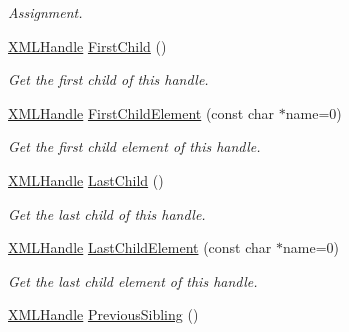 \begin{DoxyCompactItemize}
\begin{DoxyCompactList}\small\item\em Assignment. \end{DoxyCompactList}\item 
\hypertarget{classtinyxml2_1_1_x_m_l_handle_a536447dc7f54c0cd11e031dad94795ae}{}\hyperlink{classtinyxml2_1_1_x_m_l_handle}{X\+M\+L\+Handle} \hyperlink{classtinyxml2_1_1_x_m_l_handle_a536447dc7f54c0cd11e031dad94795ae}{First\+Child} ()\label{classtinyxml2_1_1_x_m_l_handle_a536447dc7f54c0cd11e031dad94795ae}

\begin{DoxyCompactList}\small\item\em Get the first child of this handle. \end{DoxyCompactList}\item 
\hypertarget{classtinyxml2_1_1_x_m_l_handle_a74b04dd0f15e0bf01860e282b840b6a3}{}\hyperlink{classtinyxml2_1_1_x_m_l_handle}{X\+M\+L\+Handle} \hyperlink{classtinyxml2_1_1_x_m_l_handle_a74b04dd0f15e0bf01860e282b840b6a3}{First\+Child\+Element} (const char $\ast$name=0)\label{classtinyxml2_1_1_x_m_l_handle_a74b04dd0f15e0bf01860e282b840b6a3}

\begin{DoxyCompactList}\small\item\em Get the first child element of this handle. \end{DoxyCompactList}\item 
\hypertarget{classtinyxml2_1_1_x_m_l_handle_a9d09f04435f0f2f7d0816b0198d0517b}{}\hyperlink{classtinyxml2_1_1_x_m_l_handle}{X\+M\+L\+Handle} \hyperlink{classtinyxml2_1_1_x_m_l_handle_a9d09f04435f0f2f7d0816b0198d0517b}{Last\+Child} ()\label{classtinyxml2_1_1_x_m_l_handle_a9d09f04435f0f2f7d0816b0198d0517b}

\begin{DoxyCompactList}\small\item\em Get the last child of this handle. \end{DoxyCompactList}\item 
\hypertarget{classtinyxml2_1_1_x_m_l_handle_a42cccd0ce8b1ce704f431025e9f19e0c}{}\hyperlink{classtinyxml2_1_1_x_m_l_handle}{X\+M\+L\+Handle} \hyperlink{classtinyxml2_1_1_x_m_l_handle_a42cccd0ce8b1ce704f431025e9f19e0c}{Last\+Child\+Element} (const char $\ast$name=0)\label{classtinyxml2_1_1_x_m_l_handle_a42cccd0ce8b1ce704f431025e9f19e0c}

\begin{DoxyCompactList}\small\item\em Get the last child element of this handle. \end{DoxyCompactList}\item 
\hypertarget{classtinyxml2_1_1_x_m_l_handle_a428374e756f4db4cbc287fec64eae02c}{}\hyperlink{classtinyxml2_1_1_x_m_l_handle}{X\+M\+L\+Handle} \hyperlink{classtinyxml2_1_1_x_m_l_handle_a428374e756f4db4cbc287fec64eae02c}{Previous\+Sibling} ()\label{classtinyxml2_1_1_x_m_l_handle_a428374e756f4db4cbc287fec64eae02c}


\end{DoxyCompactItemize}
